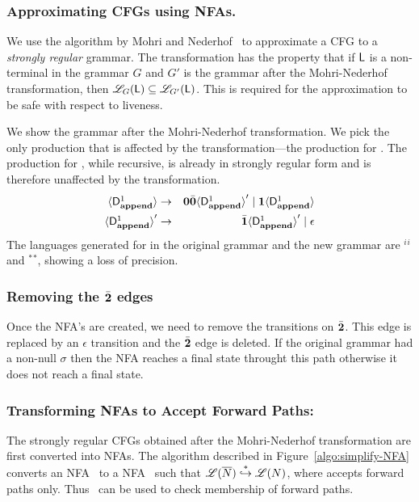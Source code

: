 \documentclass[9pt]{sigplanconf}
\newcommand{\comment}[1]{{\color{Myblue}{(#1)}}}
\begin{document}
\subsubsection{Approximating CFGs using NFAs.}
\label{sec:NFA-approx}
\comment{Change the language and the example}
We use the
algorithm  by  Mohri  and Nederhof~\cite{mohri00regular}   to
approximate a CFG  to a   {\em strongly regular\/} grammar.  The
transformation has  the  property that  if $\mathsf{L}$  is a
non-terminal  in the grammar  $G$ and  $G'$ is  the grammar  after the
Mohri-Nederhof transformation, then  ${\mathscr L}_G(\mathsf{L}) \subseteq
{\mathscr
  L}_{G'}(\mathsf{L})$.    This  is   required  for the
approximation to be safe with respect to liveness.

We show the  grammar after the Mohri-Nederhof
transformation. We  pick the only production that  is affected by
the transformation---the production for .  The
production for , while  recursive, is already in
strongly  regular  form  and   is  therefore  unaffected  by  the
transformation.
 \begin{eqnarray*}
  \var{\Df{\append}{1}}
  &\rightarrow&               \acar\bcar \var{\Df{\append}{1}}'  \mid
  \acdr\var{\Df{\append}{1}} \\
\var{\Df{\append}{1}}'  &\rightarrow&   \bcdr\var{\Df{\append}{1}}'
\mid \epsilon
\end{eqnarray*}
The  languages
generated for   in  the original grammar  and the
new       grammar      are       \acdr$^i$\acar\bcar\bcdr$^i$      and
\acdr$^*$\acar\bcar\bcdr$^*$, showing a  loss of  precision.

\subsubsection{Removing the $\bar{\mathbf{2}}$ edges}
Once the NFA's are created, we need to remove the transitions on
$\bar{\mathbf{2}}$. This edge is replaced by an $\epsilon$ transition and the
$\bar{\mathbf{2}}$ edge is deleted. If the original grammar had a non-null
$\sigma$ then the NFA reaches a final state throught this path
otherwise it does not reach a final state.\comment{Need to rewrite
this}
\subsubsection{Transforming NFAs to Accept Forward Paths:}
The strongly regular CFGs obtained after the Mohri-Nederhof
transformation are
  first converted  into  NFAs.  The        algorithm         described
      in
Figure~\ref{algo:simplify-NFA} converts  an NFA \ntbar\  to a NFA
\nt\ such that  $\mathscr{L}({\overline{N}}) \stackrel{*}{\hookrightarrow}
\mathscr{L}({N})$, where {\nt} accepts forward paths only.
\comment{Rewrite the algorithm to handle \cbar and update the example
automata}
Thus  \nt\  can  be  used  to  check
membership of forward paths.
\end{document}
